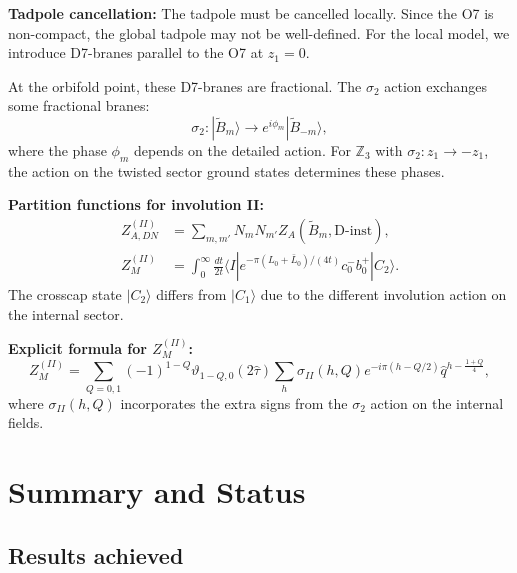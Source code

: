 \documentclass[11pt]{article}
\newcommand{\Z}{\mathbb{Z}}
\newcommand{\vt}{\vartheta}
\newcommand{\hq}{\hat{q}}
\newcommand{\htau}{\hat{\tau}}
\begin{document}
\textbf{Tadpole cancellation:} The tadpole must be cancelled locally. Since the O7 is non-compact, the global tadpole may not be well-defined. For the local model, we introduce D7-branes parallel to the O7 at $z_1 = 0$.

At the orbifold point, these D7-branes are fractional. The $\sigma_2$ action exchanges some fractional branes:
\begin{equation}
\sigma_2: |\tilde{B}_m\rangle \to e^{i\phi_m} |\tilde{B}_{-m}\rangle,
\end{equation}
where the phase $\phi_m$ depends on the detailed action. For $\Z_3$ with $\sigma_2: z_1 \to -z_1$, the action on the twisted sector ground states determines these phases.

\textbf{Partition functions for involution II:}
\begin{align}
Z_{A,DN}^{(II)} &= \sum_{m,m'} N_m N_{m'} Z_A(\tilde{B}_m, \text{D-inst}), \\
Z_M^{(II)} &= \int_0^\infty \frac{dt}{2t} \langle I | e^{-\pi(L_0+\bar{L}_0)/(4t)} c_0^- b_0^+ | C_2\rangle.
\end{align}
The crosscap state $|C_2\rangle$ differs from $|C_1\rangle$ due to the different involution action on the internal sector.

\textbf{Explicit formula for $Z_M^{(II)}$:}
\begin{equation}
Z_M^{(II)} = \sum_{Q=0,1} (-1)^{1-Q} \vt_{1-Q,0}(2\htau) \sum_h \sigma_{II}(h,Q) e^{-i\pi(h-Q/2)} \hq^{h - \frac{1+Q}{4}},
\end{equation}
where $\sigma_{II}(h,Q)$ incorporates the extra signs from the $\sigma_2$ action on the internal fields.

\section{Summary and Status}

\subsection{Results achieved}
\end{document}
